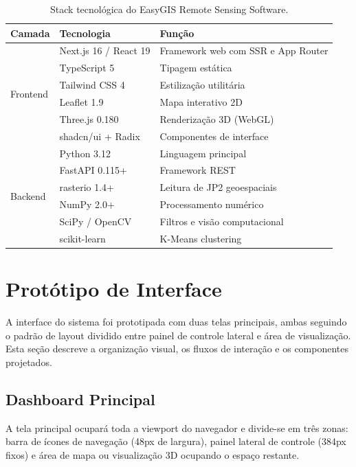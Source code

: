 \documentclass[12pt, a4paper]{article}
\begin{document}
\begin{table}[H]
\centering
\caption{Stack tecnológica do EasyGIS Remote Sensing Software.}
\label{tab:stack}
\footnotesize
\begin{tabularx}{\textwidth}{llX}
\toprule
\textbf{Camada} & \textbf{Tecnologia} & \textbf{Função} \\
\midrule
\multirow{6}{*}{Frontend}
  & Next.js 16 / React 19 & Framework web com SSR e App Router \\
  & TypeScript 5 & Tipagem estática \\
  & Tailwind CSS 4 & Estilização utilitária \\
  & Leaflet 1.9 & Mapa interativo 2D \\
  & Three.js 0.180 & Renderização 3D (WebGL) \\
  & shadcn/ui + Radix & Componentes de interface \\
\midrule
\multirow{6}{*}{Backend}
  & Python 3.12 & Linguagem principal \\
  & FastAPI 0.115+ & Framework REST \\
  & rasterio 1.4+ & Leitura de JP2 geoespaciais \\
  & NumPy 2.0+ & Processamento numérico \\
  & SciPy / OpenCV & Filtros e visão computacional \\
  & scikit-learn & K-Means clustering \\
\bottomrule
\end{tabularx}
\end{table}

\section{Protótipo de Interface}

A interface do sistema foi prototipada com duas telas principais, ambas seguindo o padrão de layout dividido entre painel de controle lateral e área de visualização. Esta seção descreve a organização visual, os fluxos de interação e os componentes projetados.

\subsection{Dashboard Principal}

A tela principal ocupará toda a viewport do navegador e divide-se em três zonas: barra de ícones de navegação (48px de largura), painel lateral de controle (384px fixos) e área de mapa ou visualização 3D ocupando o espaço restante.
\end{document}
